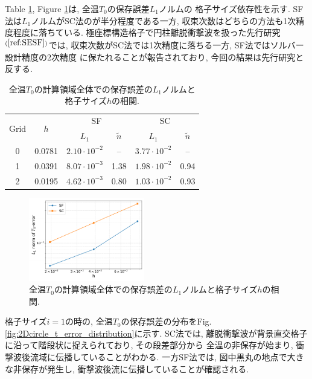 \documentclass[a4j]{jarticle}
\begin{document}
Table \ref{tab:2D_circle_global_error}, Figure \ref{fig:2Dcircle_t_error}は, 全温$T_0$の保存誤差$L_1$ノルムの
格子サイズ依存性を示す.
SF法は$L_1$ノルムがSC法のが半分程度である一方, 収束次数はどちらの方法も1次精度程度に落ちている.
極座標構造格子で円柱離脱衝撃波を扱った先行研究$^{(\ref{ref:SESF})}$では, 収束次数がSC法では1次精度に落ちる一方, SF法ではソルバー設計精度の2次精度
に保たれることが報告されており, 今回の結果は先行研究と反する.
\begin{table}[h]
  \centering
  \caption{全温$T_0$の計算領域全体での保存誤差の$L_1$ノルムと格子サイズ$h$の相関.}
  \begin{tabular}{cccccc}
    \toprule
    \multirow{2}{*}{Grid} & \multirow{2}{*}{$h$}
    & \multicolumn{2}{c}{SF} & \multicolumn{2}{c}{SC} \\
    \cmidrule(lr){3-4} \cmidrule(lr){5-6}
    & & $L_1$ & $\tilde{n}$ & $L_1$ & $\tilde{n}$ \\
    \midrule
    0 & 0.0781 & $2.10 \cdot 10^{-2}$ & –    & $3.77 \cdot 10^{-2}$ & – \\
    1 & 0.0391 & $8.07 \cdot 10^{-3}$ & 1.38 & $1.98 \cdot 10^{-2}$ & 0.94 \\
    2 & 0.0195 & $4.62 \cdot 10^{-3}$ & 0.80 & $1.03 \cdot 10^{-2}$ & 0.93 \\
    \bottomrule
  \end{tabular} 
  \label{tab:2D_circle_global_error}
\end{table}

\begin{figure}[h]
    \begin{center}
        \includegraphics[width=0.45\textwidth]{2Dcircle_t_error.pdf}
    \end{center}
    \caption{全温$T_0$の計算領域全体での保存誤差の$L_1$ノルムと格子サイズ$h$の相関.}
    \label{fig:2Dcircle_t_error}
\end{figure}

格子サイズ$i=1$の時の, 全温$T_0$の保存誤差の分布をFig.\ref{fig:2Dcircle_t_error_distribution}に示す. 
SC法では, 離脱衝撃波が背景直交格子に沿って階段状に捉えられており, その段差部分から
全温の非保存が始まり, 衝撃波後流域に伝播していることがわかる.
一方SF法では, 図中黒丸の地点で大きな非保存が発生し, 衝撃波後流に伝播していることが確認される.
\end{document}
